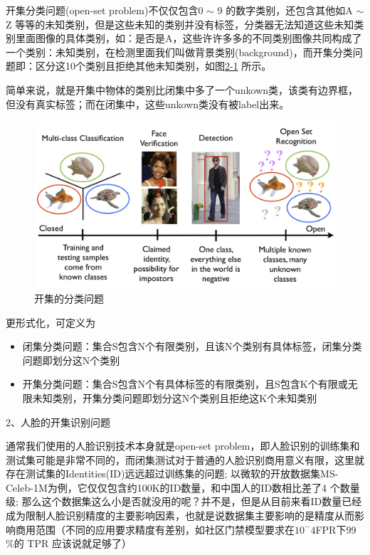 开集分类问题(open-set problem)不仅仅包含0 $\sim$ 9 的数字类别，还包含其他如A $\sim$ Z 等等的未知类别，但是这些未知的类别并没有标签，分类器无法知道这些未知类别里面图像的具体类别，如：是否是A，这些许许多多的不同类别图像共同构成了一个类别：未知类别，在检测里面我们叫做背景类别(background)，而开集分类问题即：区分这10个类别且拒绝其他未知类别，如图\href{fig:2-1}{2-1} 所示。

简单来说，就是开集中物体的类别比闭集中多了一个unkown类，该类有边界框，但没有真实标签；而在闭集中，这些unkown类没有被label出来。
\begin{figure}
  \centering
  \includegraphics[width=4.5in]{figure/example/OpenSet1.jpg}
  \caption{开集的分类问题}\label{fig:2-1}
\end{figure}

更形式化，可定义为
\begin{itemize}
    \item 闭集分类问题：集合S包含N个有限类别，且该N个类别有具体标签，闭集分类问题即划分这N个类别
    \item 开集分类问题：集合S包含N个有具体标签的有限类别，且S包含K个有限或无限未知类别，开集分类问题即划分这N个类别且拒绝这K个未知类别 \\
\end{itemize}

2、人脸的开集识别问题

通常我们使用的人脸识别技术本身就是open-set problem，即人脸识别的训练集和测试集可能是非常不同的，而闭集测试对于普通的人脸识别商用意义有限，这里就存在测试集的Identities(ID)远远超过训练集的问题; 以微软的开放数据集MS-Celeb-1M为例，它仅仅包含约100K的ID数量，和中国人的ID数相比差了4 个数量级; 那么这个数据集这么小是否就没用的呢？并不是，但是从目前来看ID数量已经成为限制人脸识别精度的主要影响因素，也就是说数据集主要影响的是精度从而影响商用范围（不同的应用要求精度有差别，如社区门禁模型要求在$10^-4$FPR下99$\%$的 TPR 应该说就足够了）

